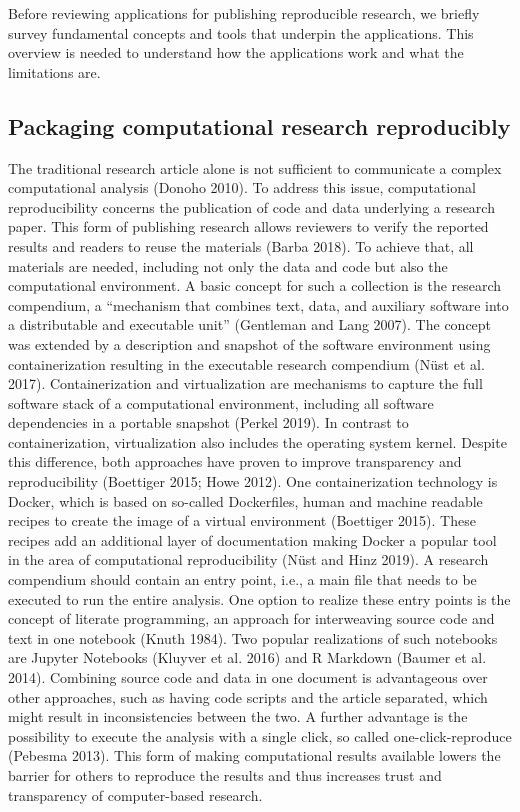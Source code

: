 \documentclass[onecolumn]{article}
\begin{document}
Before reviewing applications for publishing reproducible research, we
briefly survey fundamental concepts and tools that underpin the
applications. This overview is needed to understand how the applications
work and what the limitations are.

\hypertarget{packaging-computational-research-reproducibly}{%
\subsection{Packaging computational research
reproducibly}\label{packaging-computational-research-reproducibly}}

The traditional research article alone is not sufficient to communicate
a complex computational analysis (Donoho 2010). To address this issue,
computational reproducibility concerns the publication of code and data
underlying a research paper. This form of publishing research allows
reviewers to verify the reported results and readers to reuse the
materials (Barba 2018). To achieve that, all materials are needed,
including not only the data and code but also the computational
environment. A basic concept for such a collection is the research
compendium, a ``mechanism that combines text, data, and auxiliary
software into a distributable and executable unit'' (Gentleman and Lang
2007). The concept was extended by a description and snapshot of the
software environment using containerization resulting in the executable
research compendium (Nüst et al. 2017). Containerization and
virtualization are mechanisms to capture the full software stack of a
computational environment, including all software dependencies in a
portable snapshot (Perkel 2019). In contrast to containerization,
virtualization also includes the operating system kernel. Despite this
difference, both approaches have proven to improve transparency and
reproducibility (Boettiger 2015; Howe 2012). One containerization
technology is Docker, which is based on so-called Dockerfiles, human and
machine readable recipes to create the image of a virtual environment
(Boettiger 2015). These recipes add an additional layer of documentation
making Docker a popular tool in the area of computational
reproducibility (Nüst and Hinz 2019). A research compendium should
contain an entry point, i.e., a main file that needs to be executed to
run the entire analysis. One option to realize these entry points is the
concept of literate programming, an approach for interweaving source
code and text in one notebook (Knuth 1984). Two popular realizations of
such notebooks are Jupyter Notebooks (Kluyver et al. 2016) and R
Markdown (Baumer et al. 2014). Combining source code and data in one
document is advantageous over other approaches, such as having code
scripts and the article separated, which might result in inconsistencies
between the two. A further advantage is the possibility to execute the
analysis with a single click, so called one-click-reproduce (Pebesma
2013). This form of making computational results available lowers the
barrier for others to reproduce the results and thus increases trust and
transparency of computer-based research.
\end{document}
